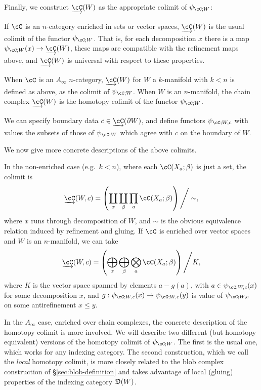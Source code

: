 Finally, we construct $\cl{\cC}(W)$ as the appropriate colimit of $\psi_{\cC;W}$:

\begin{defn}
\label{def:colim-fields}
If $\cC$ is an $n$-category enriched in sets or vector spaces, $\cl{\cC}(W)$ is the usual colimit of the functor $\psi_{\cC;W}$.
That is, for each decomposition $x$ there is a map
$\psi_{\cC;W}(x)\to \cl{\cC}(W)$, these maps are compatible with the refinement maps
above, and $\cl{\cC}(W)$ is universal with respect to these properties.
\end{defn}

\begin{defn}
When $\cC$ is an $A_\infty$ $n$-category, $\cl{\cC}(W)$ for $W$ a $k$-manifold with $k < n$ 
is defined as above, as the colimit of $\psi_{\cC;W}$.
When $W$ is an $n$-manifold, the chain complex $\cl{\cC}(W)$ is the homotopy colimit of the functor $\psi_{\cC;W}$.
\end{defn}

We can specify boundary data $c \in \cl{\cC}(\bdy W)$, and define functors $\psi_{\cC;W,c}$ 
with values the subsets of those of $\psi_{\cC;W}$ which agree with $c$ on the boundary of $W$.

We now give more concrete descriptions of the above colimits.

In the non-enriched case (e.g.\ $k<n$), where each $\cC(X_a; \beta)$ is just a set,
the colimit is
\[
	\cl{\cC}(W,c) = \left( \coprod_x \coprod_\beta \prod_a \cC(X_a; \beta) \right) \Bigg/ \sim ,
\]
where $x$ runs through decomposition of $W$, and $\sim$ is the obvious equivalence relation 
induced by refinement and gluing.
If $\cC$ is enriched over vector spaces and $W$ is an $n$-manifold, 
we can take
\begin{equation*}
	\cl{\cC}(W,c) = \left( \bigoplus_x \bigoplus_\beta \bigotimes_a \cC(X_a; \beta) \right) \Bigg/ K,
\end{equation*}
where $K$ is the vector space spanned by elements $a - g(a)$, with
$a\in \psi_{\cC;W,c}(x)$ for some decomposition $x$, and $g: \psi_{\cC;W,c}(x)
\to \psi_{\cC;W,c}(y)$ is value of $\psi_{\cC;W,c}$ on some antirefinement $x \leq y$.

In the $A_\infty$ case, enriched over chain complexes, the concrete description of the homotopy colimit
is more involved.
We will describe two different (but homotopy equivalent) versions of the homotopy colimit of $\psi_{\cC;W}$.
The first is the usual one, which works for any indexing category.
The second construction, which we call the {\it local} homotopy colimit,
is more closely related to the blob complex
construction of \S \ref{sec:blob-definition} and takes advantage of local (gluing) properties
of the indexing category $\mathfrak{D}(W)$.

